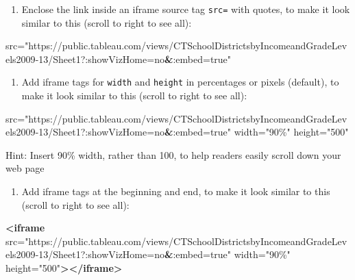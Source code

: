\documentclass[
  english,
]{book}
\newenvironment{Shaded}{\begin{snugshade}}{\end{snugshade}}
\newcommand{\ErrorTok}[1]{\textcolor[rgb]{0.64,0.00,0.00}{\textbf{#1}}}
\newcommand{\KeywordTok}[1]{\textcolor[rgb]{0.13,0.29,0.53}{\textbf{#1}}}
\newcommand{\NormalTok}[1]{#1}
\newcommand{\OtherTok}[1]{\textcolor[rgb]{0.56,0.35,0.01}{#1}}
\newcommand{\StringTok}[1]{\textcolor[rgb]{0.31,0.60,0.02}{#1}}
\providecommand{\tightlist}{%
  \setlength{\itemsep}{0pt}\setlength{\parskip}{0pt}}
\begin{document}
\begin{enumerate}
\def\labelenumi{\arabic{enumi})}
\setcounter{enumi}{8}
\tightlist
\item
  Enclose the link inside an iframe source tag \texttt{src=} with quotes, to make it look similar to this (scroll to right to see all):
\end{enumerate}

\begin{Shaded}
\begin{Highlighting}[]
\NormalTok{src="https://public.tableau.com/views/CTSchoolDistrictsbyIncomeandGradeLevels2009{-}13/Sheet1?:showVizHome=no}\ErrorTok{\&}\NormalTok{:embed=true"}
\end{Highlighting}
\end{Shaded}

\begin{enumerate}
\def\labelenumi{\arabic{enumi})}
\setcounter{enumi}{9}
\tightlist
\item
  Add iframe tags for \texttt{width} and \texttt{height} in percentages or pixels (default), to make it look similar to this (scroll to right to see all):
\end{enumerate}

\begin{Shaded}
\begin{Highlighting}[]
\NormalTok{src="https://public.tableau.com/views/CTSchoolDistrictsbyIncomeandGradeLevels2009{-}13/Sheet1?:showVizHome=no}\ErrorTok{\&}\NormalTok{:embed=true" width="90\%" height="500"}
\end{Highlighting}
\end{Shaded}

Hint: Insert 90\% width, rather than 100, to help readers easily scroll down your web page

\begin{enumerate}
\def\labelenumi{\arabic{enumi})}
\setcounter{enumi}{10}
\tightlist
\item
  Add iframe tags at the beginning and end, to make it look similar to this (scroll to right to see all):
\end{enumerate}

\begin{Shaded}
\begin{Highlighting}[]
\KeywordTok{<iframe}\OtherTok{ src=}\StringTok{"https://public.tableau.com/views/CTSchoolDistrictsbyIncomeandGradeLevels2009{-}13/Sheet1?:showVizHome=no}\ErrorTok{\&}\StringTok{:embed=true"}\OtherTok{ width=}\StringTok{"90\%"}\OtherTok{ height=}\StringTok{"500"}\KeywordTok{></iframe>}
\end{Highlighting}
\end{Shaded}
\end{document}
